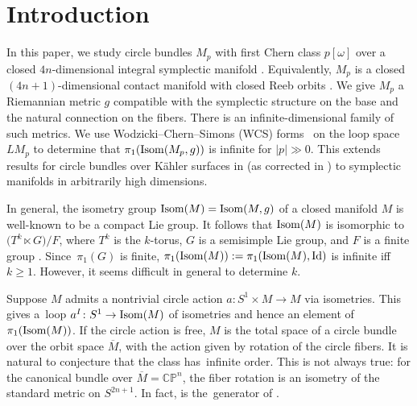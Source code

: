 \documentclass[pdftex]{sigma}
\numberwithin{equation}{section}
\theoremstyle{definition}
\newcommand{\BbP}{{\mathbb P}}
\newcommand{\BbC}{{\mathbb C}}
\newcommand{\BbZ}{{\mathbb Z}}
\newcommand{\Z}{\BbZ}
\newcommand{\bg}{ g}
\newcommand{\bm}{ M}
\newcommand{\ocs}{\widetilde{{\rm CS}}}
\newcommand{\om}{\overline{M}}
\newcommand{\omp}{M_p}
\newcommand{\isom}{{\rm Isom}}
\newcommand{\isombm}{\isom(\bm)}
\begin{document}

\renewcommand{\thefootnote}{\arabic{footnote}}
\setcounter{footnote}{0}

\section{Introduction}

In this paper, we study
circle bundles $\omp$ with first Chern class $p[\omega]$ over a closed $4n$-dimensional integral
symplectic manifold . Equivalently, $\omp$ is a
closed
$(4n+1)$-dimen\-sion\-al contact manifold with closed Reeb orbits \cite[Theorem~3.9]{Blair}. We give $\omp$ a Riemannian metric $\bg$ compatible with the symplectic structure on the base and the natural connection on the fibers. There is an infinite-dimensional family of such metrics.
We use Wodzicki--Chern--Simons (WCS) forms~\smash{$\ocs{}^{\rm W}_{2k-1}$} on the loop space $L\omp$ to determine that
 $\pi_1({\rm Isom}(\omp,\bg))$ is infinite for $|p| \gg 0$. This extends results for circle bundles over K\"ahler surfaces in \cite{MRT4} (as corrected in \cite{MRT4-cor}) to symplectic manifolds in arbitrarily high dimensions.

In general, the isometry group $\isom(\bm) = \isom(\bm,g)$ of a closed manifold $\bm$ is well-known to be a compact Lie group. It follows that $\isom(\bm)$ is isomorphic to
$\bigl(T^k\ltimes G\bigr)/F$, where $T^k$ is the $k$-torus, $G$ is a semisimple Lie group, and $F$ is a finite group \cite[Theorem~6.9]{Bredon}.
Since~$\pi_1(G)$ is finite, $ \pi_1(\isom(\bm)) :=\pi_1(\isom(\bm), {\rm Id}) $
 is infinite iff $k \geq 1$.
However, it seems difficult in general to determine $k$.

Suppose $M$ admits a nontrivial circle action $a\colon S^1\times
M\to M$ via isometries. This gives a~loop $a^I\colon S^1\to \isombm$ of isometries and hence an element of
 $\pi_1(\isombm)$. If the circle action is free, $M$ is the total space of a circle bundle over the orbit space $\om$, with the action given by rotation of the circle fibers. It is natural to conjecture that
 the class \smash{\raisebox{0.2pt}{$\bigl[a^I\bigr]\in \pi_1(\isombm)$}} has~infinite order. This is not always true: for the canonical bundle  over $\overline M = \BbC\BbP^n$,
 the fiber rotation is an isometry of the standard metric on $S^{2n+1}$.
In fact, \smash{$\bigl[a^I\bigr]$} is the~generator of \smash{$\pi_1\bigl(\isom\bigl(S^{2n+1}\bigr)\bigr) = \pi_1({\rm SO}(2n+2))\simeq \Z_2$}.
\end{document}
